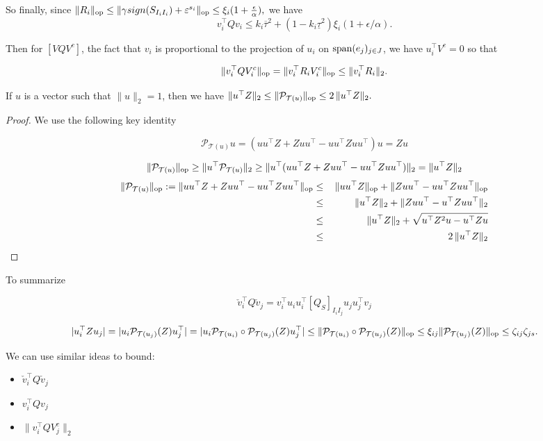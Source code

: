 \documentclass[letterpaper]{article}
\begin{document}
So finally, since $\|R_i\|_{{\rm op}} \leq \|\gamma sign(S_{I_iI_i})+\varepsilon^{s_i}\|_{{\rm op}} \leq \xi_i (1+\frac{\epsilon}{\alpha}),$ we have 
$$v_i^\top Q v_i \leq k_i \overline{\tau}^2+(1-k_i\underline{\tau}^2) \xi_i (1+\epsilon/\alpha).$$
 
 
Then for $[V Q V^c]$, the fact that $v_i$ is proportional to the projection of $u_i$ on ${\rm span}(e_j)_{j \in J}$, we have $u_i^\top V^c=0$ so that

$$\|v_i^\top Q V_i^c\|_{{\rm op}}=\|v_i^\top R_i V_i^c\|_{{\rm op}} \leq \|v_i^\top R_i\|_{2}.$$
 
\begin{lemma}
If $u$ is a vector such that $\|u\|_2=1$, then we have
 $\|u^\top Z\|_{2} \leq \|\mathcal{P}_{\mathcal{T}(u)}\|_{{\rm op}}  \leq 2\, \|u^\top Z\|_{2}.$
\end{lemma}
\begin{proof}
We use the following key identity
 
 $$\mathcal{P}_{\mathcal{T}(u)} u=(uu^\top Z + Z uu^\top - u u^\top Z u u^\top) u =Zu$$

$$\|\mathcal{P}_{\mathcal{T}(u)}\|_{{\rm op}} \geq \|u^\top \mathcal{P}_{\mathcal{T}(u)}\|_{2} \geq \|u^\top (uu^\top Z + Z uu^\top - u u^\top Z u u^\top) \|_{2}=\|u^\top Z\|_{2}
$$
\begin{eqnarray*}
\|\mathcal{P}_{\mathcal{T}(u)}\|_{{\rm op}}:=\|uu^\top Z + Z uu^\top - u u^\top Z u u^\top\|_{{\rm op}}  
& \leq & \, \|uu^\top Z\|_{{\rm op}} + \|Z uu^\top - u u^\top Z u u^\top\|_{{\rm op}}\\
& \leq &  \, \|u^\top Z\|_{2} + \|Z uu^\top - u^\top Z u u^\top\|_{2}\\
& \leq &  \,\|u^\top Z\|_{2} + \sqrt{u^\top Z^2 u - u^\top Z u }\\
& \leq & 2 \, \|u^\top Z\|_{2}
\end{eqnarray*}
\end{proof}

To summarize

$$\check{v}_i^\top Q \check{v}_j=v_i^\top u_i u_i^\top [Q_{S}]_{I_i I_j} u_j u_j^\top v_j$$


$$|u_i^\top Z u_j| = |u_i \mathcal{P}_{\mathcal{T}(u_j)}(Z) u_j^\top|=|u_i \mathcal{P}_{\mathcal{T}(u_i)} \circ \mathcal{P}_{\mathcal{T}(u_j)}(Z) u_j^\top| \leq \|\mathcal{P}_{\mathcal{T}(u_i)} \circ \mathcal{P}_{\mathcal{T}(u_j)}(Z)\|_{{\rm op}} \leq \xi_{ij} \|\mathcal{P}_{\mathcal{T}(u_j)}(Z)\|_{{\rm op}} \leq \zeta_{ij} \zeta_{js}.$$

We can use similar ideas to bound:
\begin{itemize}
\item $\check{v}_i^\top Q \check{v}_j$ 
\item $v_i^\top Q v_j$
\item $\|v_i^\top Q V_j^c\|_2$
\end{itemize}
\end{document}
